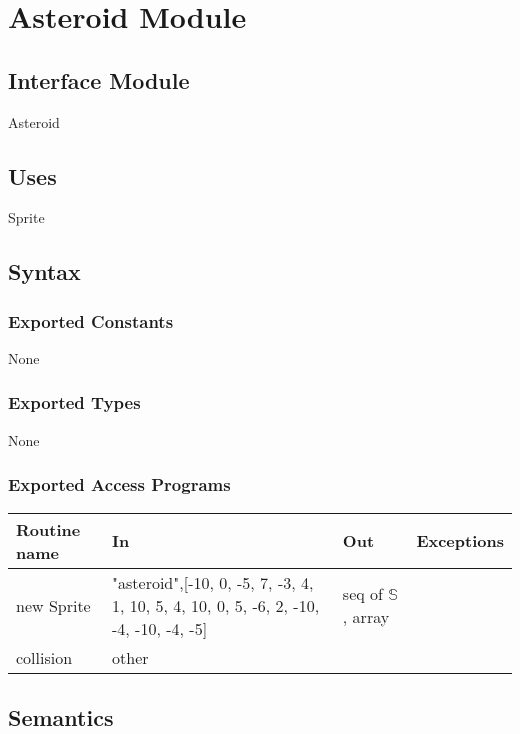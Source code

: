 \documentclass[12pt]{article}
\begin{document}
\section* {Asteroid Module}

\subsection*{Interface Module}

Asteroid

\subsection* {Uses}

Sprite

\subsection* {Syntax}

\subsubsection* {Exported Constants}

None

\subsubsection* {Exported Types}

None 

\subsubsection* {Exported Access Programs}

\begin{tabular}{| l | l | l | p{5cm} |}
\hline
\textbf{Routine name} & \textbf{In} & \textbf{Out} & \textbf{Exceptions}\\
\hline
new Sprite & "asteroid",[-10,   0,
              -5,   7,
              -3,   4,
               1,  10,
               5,   4,
              10,   0,
               5,  -6,
               2, -10,
              -4, -10,
              -4,  -5]  & seq of $\mathbb{S}$, array & ~\\
\hline
collision & other & ~ & ~\\

\end{tabular}
\subsection* {Semantics}
\end{document}
